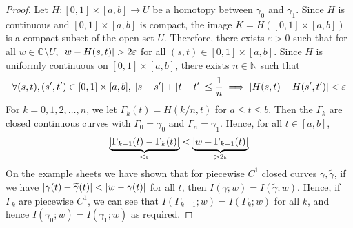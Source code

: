 \begin{proof}
	Let \( H \colon [0,1] \times [a,b] \to U \) be a homotopy between \( \gamma_0 \) and \( \gamma_1 \).
	Since \( H \) is continuous and \( [0,1] \times [a,b] \) is compact, the image \( K = H([0,1] \times [a,b]) \) is a compact subset of the open set \( U \).
	Therefore, there exists \( \varepsilon > 0 \) such that for all \( w \in \mathbb C \setminus U \), \( \abs{w - H(s,t)} > 2\varepsilon \) for all \( (s,t) \in [0,1] \times [a,b] \).
	Since \( H \) is uniformly continuous on \( [0,1] \times [a,b] \), there exists \( n \in \mathbb N \) such that
	\[
		\forall (s,t),(s',t') \in [0,1] \times [a,b],\; \abs{s-s'} + \abs{t-t'} \leq \frac{1}{n} \implies \abs{H(s,t) - H(s',t')} < \varepsilon
	\]
	For \( k = 0,1,2,\dots,n \), we let \( \Gamma_k(t) = H(k/n,t) \) for \( a \leq t \leq b \).
	Then the \( \Gamma_k \) are closed continuous curves with \( \Gamma_0 = \gamma_0 \) and \( \Gamma_n = \gamma_1 \).
	Hence, for all \( t \in [a,b] \),
	\[
		\underbrace{\abs{\Gamma_{k-1}(t) - \Gamma_k(t)}}_{< \varepsilon} < \underbrace{\abs{w - \Gamma_{k-1}(t)}}_{> 2 \varepsilon}
	\]
	On the example sheets we have shown that for piecewise \( C^1 \) closed curves \( \gamma, \widetilde \gamma \), if we have \( \abs{\gamma(t) - \widetilde \gamma(t)} < \abs{w - \gamma(t)} \) for all \( t \), then \( I(\gamma;w) = I(\widetilde \gamma;w) \).
	Hence, if \( \Gamma_k \) are piecewise \( C^1 \), we can see that \( I(\Gamma_{k-1};w) = I(\Gamma_k;w) \) for all \( k \), and hence \( I(\gamma_0;w) = I(\gamma_1;w) \) as required.


\end{proof}
